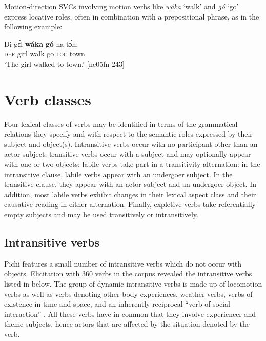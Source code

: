 Motion-direction SVCs involving motion verbs like \textit{wáka} ‘walk’ and \textit{gó} ‘go’ express locative roles, often in combination with a prepositional phrase, as in the following example: 


\ea%
    \label{ex:key:1079}
    \gll Di  gɛ́l    \textbf{wáka}  \textbf{gó}  na  tɔ́n.\\
\textsc{def}  girl    walk  go  \textsc{loc}  town\\

\glt ‘The girl walked to town.’ [ne05fn 243]
\z

\section{Verb classes}\label{sec:9.2}

Four lexical classes of verbs may be identified in terms of the grammatical relations they specify and with respect to the semantic roles expressed by their subject and object(s). Intransitive verbs occur with no participant other than an actor subject; transitive verbs occur with a subject and may optionally appear with one or two objects; labile verbs take part in a transitivity alternation: in the intransitive clause, labile verbs appear with an undergoer subject. In the transitive clause, they appear with an actor subject and an undergoer object. In addition, most labile verbs exhibit changes in their lexical aspect class and their causative reading in either alternation. Finally, expletive verbs take referentially empty subjects and may be used transitively or intransitively.

\subsection{Intransitive verbs}\label{sec:9.2.1}

Pichi features a small number of intransitive verbs which do not occur with objects. Elicitation with 360 verbs in the corpus revealed the intransitive verbs listed in  below. The group of dynamic intransitive verbs is made up of locomotion verbs as well as verbs denoting other body experiences, weather verbs, verbs of existence in time and space, and an inherently reciprocal “verb of social interaction” \citep[201]{Levin1993}. All these verbs have in common that they involve experiencer and theme subjects, hence actors that are affected by the situation denoted by the verb.

